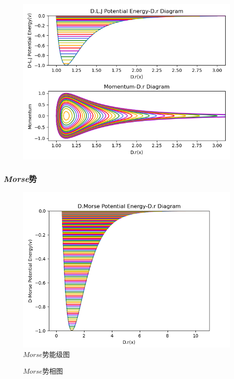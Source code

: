 \documentclass[11pt, a4paper, oneside]{ctexart}
\begin{document}
{{{\begin{appendices}
{{\begin{figure}[!ht]
                \centering
                \includegraphics[scale=0.75]{023.png}
            \end{figure} 
        }
        \newpage\subsubsection{\emph{Morse}势}
        {
            \begin{figure}[!ht]
                \caption{ $Morse$势能级图}
                \centering
                \includegraphics[scale=0.75]{02-1.png}
            \end{figure} 
            \begin{figure}[!ht]
                \caption{ $Morse$势相图}
        

\end{figure}}}
\end{appendices}}}}
\end{document}
